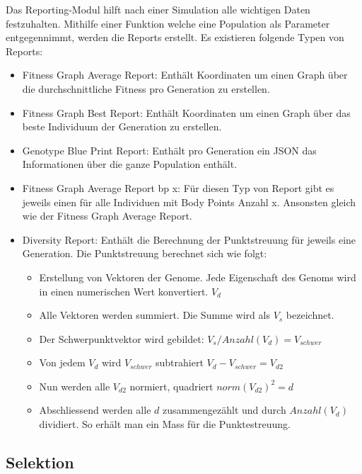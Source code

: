       Das Reporting-Modul hilft nach einer Simulation alle wichtigen Daten festzuhalten.
      Mithilfe einer Funktion welche eine Population als Parameter entgegennimmt,
      werden die Reports erstellt. Es existieren folgende Typen von Reports:
      \begin{itemize}
        \item Fitness Graph Average Report: Enthält Koordinaten um einen Graph über die durchschnittliche Fitness pro Generation zu erstellen.
        \item Fitness Graph Best Report: Enthält Koordinaten um einen Graph über das beste Individuum der Generation zu erstellen.
        \item Genotype Blue Print Report: Enthält pro Generation ein \gls{JSON} das Informationen über die ganze Population enthält.
        \item Fitness Graph Average Report bp x: Für diesen Typ von Report gibt es jeweils einen für alle Individuen mit Body Points Anzahl x.
              Ansonsten gleich wie der Fitness Graph Average Report.
        \item Diversity Report: Enthält die Berechnung der Punktstreuung für jeweils eine Generation. Die Punktstreuung berechnet sich wie folgt:
        \begin{itemize}
          \item Erstellung von Vektoren der Genome. Jede Eigenschaft des Genoms wird in einen numerischen Wert konvertiert. \( V_d \)
          \item Alle Vektoren werden summiert.  Die Summe wird als \(V_s\) bezeichnet.
          \item Der Schwerpunktvektor wird gebildet: \( V_s / Anzahl(V_d) = V_{schwer} \)
          \item Von jedem \(V_d\) wird \(V_{schwer}\) subtrahiert  \( V_d - V_{schwer}  = V_{d2} \)
          \item Nun werden alle \(V_{d2}\) normiert, quadriert \( norm{(V_{d2})}^2 = d \)
          \item Abschliessend werden alle \(d\) zusammengezählt und durch \(Anzahl(V_d)\) dividiert. So erhält man ein Mass für die Punktestreuung.
        \end{itemize}
      \end{itemize}

    \subsection{Selektion\label{sec:Selektion}}

